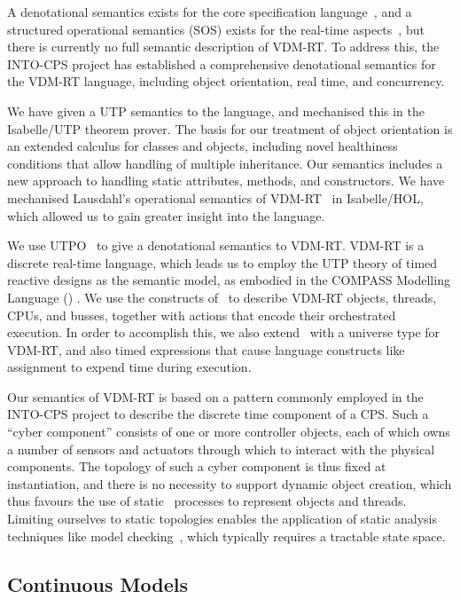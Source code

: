 A denotational semantics exists for the core specification language~\cite{Larsen&95c}, and a structured operational semantics (SOS) exists for the real-time aspects~\cite{Lausdahl&13a}, but there is currently no full semantic description of VDM-RT.  To address this, the INTO-CPS project has established a comprehensive denotational semantics for the VDM-RT language, including object orientation, real time, and concurrency.

We have given a UTP semantics to the language, and mechanised this in the Isabelle/UTP theorem prover.  The basis for our treatment of object orientation is an extended calculus for classes and objects, including novel healthiness conditions that allow handling of multiple inheritance.  Our semantics includes a new approach to handling static attributes, methods, and constructors.  We have mechanised Lausdahl's operational semantics of VDM-RT~\cite{Lausdahl&13a} in Isabelle/HOL, which allowed us to gain greater insight into the language.

We use UTPO~\cite{Hoare&98,Cavalcanti&06} to give a denotational semantics to VDM-RT.  VDM-RT is a discrete real-time language, which leads us to employ the UTP theory of timed reactive designs as the semantic model, as embodied in the COMPASS Modelling Language (\CML) \cite{Woodcock&12a,Woodcock14,Woodcock&14}.  We use the constructs of \CML\ to describe VDM-RT objects, threads, CPUs, and busses, together with actions that encode their orchestrated execution.  In order to accomplish this, we also extend \CML\ with a universe type for VDM-RT, and also timed expressions that cause language constructs like assignment to expend time during execution.

Our semantics of VDM-RT is based on a pattern commonly employed in the INTO-CPS project to describe the discrete time component of a CPS.  Such a ``cyber component'' consists of one or more controller objects, each of which owns a number of sensors and actuators through which to interact with the physical components.  The topology of such a cyber component is thus fixed at instantiation, and there is no necessity to support dynamic object creation, which thus favours the use of static \CML\ processes to represent objects and threads.  Limiting ourselves to static topologies enables the application of static analysis techniques like model checking~\cite{fdr,Oliveira2014,Beg2015}, which typically requires a tractable state space.

\subsection{Continuous Models}

